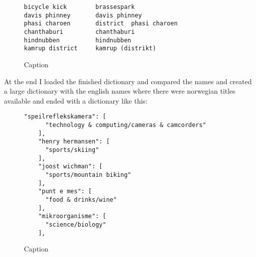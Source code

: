 \begin{figure}[h]
\centering
\begin{lstlisting}
bicycle kick        brassespark
davis phinney       davis phinney
phasi charoen       district  phasi charoen
chanthaburi         chanthaburi
hindnubben          hindnubben
kamrup district     kamrup (distrikt)
\end{lstlisting}
\caption{Caption}
\label{fig:my_label}
\end{figure}

At the end I loaded the finished dictionary and compared the names and created a large dictionary with the english names where there were norwegian titles available and ended with a dictionary like this: 

\begin{figure}[h]
\centering
\begin{lstlisting}
"speilreflekskamera": [
      "technology & computing/cameras & camcorders"
    ], 
    "henry hermansen": [
      "sports/skiing"
    ], 
    "joost wichman": [
      "sports/mountain biking"
    ], 
    "punt e mes": [
      "food & drinks/wine"
    ], 
    "mikroorganisme": [
      "science/biology"
    ], 
\end{lstlisting}
\caption{Caption}
\label{fig:my_label}
\end{figure}
